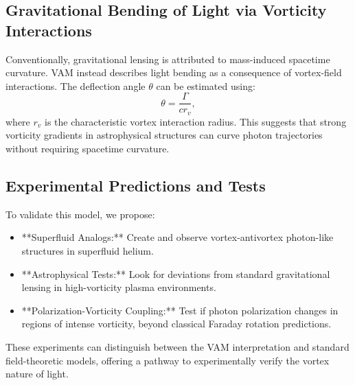 \documentclass[aps,preprint,superscriptaddress]{revtex4-2}
\begin{document}
\subsection{Gravitational Bending of Light via Vorticity Interactions}
Conventionally, gravitational lensing is attributed to mass-induced spacetime curvature. VAM instead describes light bending as a consequence of vortex-field interactions. The deflection angle $\theta$ can be estimated using:
\begin{equation}
\theta = \frac{\Gamma}{c r_v},
\end{equation}
where $r_v$ is the characteristic vortex interaction radius. This suggests that strong vorticity gradients in astrophysical structures can curve photon trajectories without requiring spacetime curvature.

\subsection{Experimental Predictions and Tests}
To validate this model, we propose:
\begin{itemize}
\item **Superfluid Analogs:** Create and observe vortex-antivortex photon-like structures in superfluid helium.
\item **Astrophysical Tests:** Look for deviations from standard gravitational lensing in high-vorticity plasma environments.
\item **Polarization-Vorticity Coupling:** Test if photon polarization changes in regions of intense vorticity, beyond classical Faraday rotation predictions.
\end{itemize}

These experiments can distinguish between the VAM interpretation and standard field-theoretic models, offering a pathway to experimentally verify the vortex nature of light.

\end{document}
